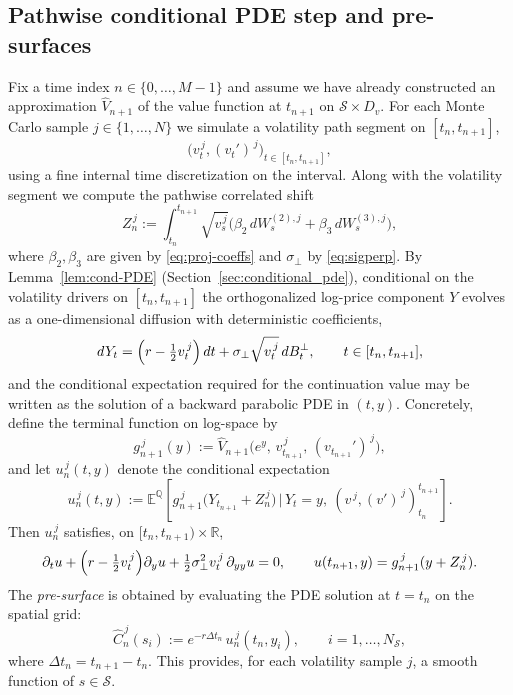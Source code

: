 \documentclass[10pt]{article}
\theoremstyle{plain}
\theoremstyle{definition}
\theoremstyle{remark}
\begin{document}
\subsection{Pathwise conditional PDE step and pre-surfaces}
Fix a time index $n\in\{0,\dots,M-1\}$ and assume we have already constructed an approximation $\widehat V_{n+1}$ of the value function at
$t_{n+1}$ on $\mathcal S\times D_v$. For each Monte Carlo sample $j\in\{1,\dots,N\}$ we simulate a volatility path segment on $[t_n,t_{n+1}]$,
\[
\bigl(v_t^{\,j},(v_t')^{\,j}\bigr)_{t\in[t_n,t_{n+1}]},
\]
using a fine internal time discretization on the interval.
Along with the volatility segment we compute the pathwise correlated shift
\begin{equation}
Z_n^{\,j}
:=\int_{t_n}^{t_{n+1}} \sqrt{v_s^{\,j}}\bigl(\beta_2\,dW_s^{(2),j}+\beta_3\,dW_s^{(3),j}\bigr),
\label{eq:Zn}
\end{equation}
where $\beta_2,\beta_3$ are given by \eqref{eq:proj-coeffs} and $\sigma_\perp$ by \eqref{eq:sigperp}.
By Lemma~\ref{lem:cond-PDE} (Section~\ref{sec:conditional_pde}), conditional on the volatility drivers on $[t_n,t_{n+1}]$ the orthogonalized
log-price component $Y$ evolves as a one-dimensional diffusion with deterministic coefficients,
\[
dY_t = \Bigl(r-\tfrac12 v_t^{\,j}\Bigr)\,dt + \sigma_\perp\sqrt{v_t^{\,j}}\,dB_t^\perp,\qquad t\in[t_n,t_{n+1}],
\]
and the conditional expectation required for the continuation value may be written as the solution of a backward parabolic PDE in $(t,y)$.
Concretely, define the terminal function on log-space by
\[
g_{n+1}^{\,j}(y) := \widehat V_{n+1}\bigl(e^{y},\,v_{t_{n+1}}^{\,j},\,(v_{t_{n+1}}')^{\,j}\bigr),
\]
and let $u_n^{\,j}(t,y)$ denote the conditional expectation
\[
u_n^{\,j}(t,y)
:= \mathbb E^{\mathbb Q}\!\left[g_{n+1}^{\,j}\bigl(Y_{t_{n+1}} + Z_n^{\,j}\bigr)\,\big|\,Y_t=y,\ (v^{\,j},(v')^{\,j})_{t_n}^{t_{n+1}}\right].
\]
Then $u_n^{\,j}$ satisfies, on $[t_n,t_{n+1})\times\mathbb R$,
\begin{equation}
\partial_t u + \Bigl(r-\tfrac12 v_t^{\,j}\Bigr)\partial_y u + \tfrac12 \sigma_\perp^2 v_t^{\,j}\,\partial_{yy}u = 0,
\qquad
u(t_{n+1},y) = g_{n+1}^{\,j}(y+Z_n^{\,j}).
\label{eq:pathwise-pde}
\end{equation}
The \emph{pre-surface} is obtained by evaluating the PDE solution at $t=t_n$ on the spatial grid:
\begin{equation}
\widehat C_n^{\,j}(s_i)
:= e^{-r\Delta t_n}\,u_n^{\,j}(t_n,y_i),
\qquad i=1,\dots,N_{\mathcal S},
\label{eq:presurface}
\end{equation}
where $\Delta t_n=t_{n+1}-t_n$. This provides, for each volatility sample $j$, a smooth function of $s\in\mathcal S$.
\end{document}
